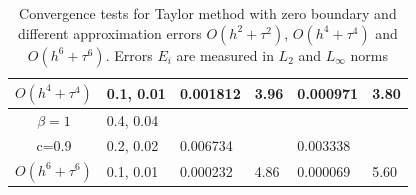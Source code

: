 \documentclass{beamer}
\begin{document}
\begin{frame}
\begin{table}[ht]
{\begin{tabular}{||c|l|ll|ll||}
       $O(h^4+ \tau^4)$ &0.1, 0.01   &0.001812 & 3.96  & 0.000971  & 3.80  \\
    \hline
  $\beta=1$     &0.4, 0.04   &            &          &                  &      \\
      c=0.9                    &0.2, 0.02   &0.006734 &           & 0.003338      &       \\
     $O(h^6+ \tau^6)$ &0.1, 0.01 & 0.000232 &4.86 & 0.000069  & 5.60        \\
	   \hline
			\hline 
		\end{tabular}
		}%
		\caption{Convergence tests for Taylor method with zero boundary and different approximation errors $O(h^{2} + \tau^2 )$, $O(h^{4} + \tau^4 )$ and $O(h^{6} + \tau^6 )$. Errors $E_i$ are measured in $L_2$ and $L_\infty$ norms}
\label{table:A}
\end{table}

\end{frame}
\end{document}
